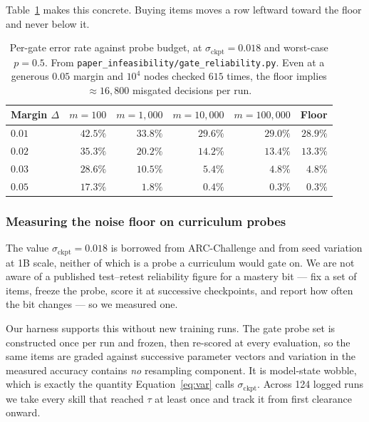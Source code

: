 \documentclass[11pt]{article}
\theoremstyle{plain}
\theoremstyle{definition}
\theoremstyle{remark}
\begin{document}
Table~\ref{tab:reliability} makes this concrete. Buying items moves a row
leftward toward the floor and never below it.

\begin{table}[ht]
\centering
\small
\begin{tabular}{@{}lrrrrr@{}}
\toprule
Margin $\Delta$ & $m{=}100$ & $m{=}1{,}000$ & $m{=}10{,}000$ & $m{=}100{,}000$ & Floor \\
\midrule
$0.01$ & $42.5\%$ & $33.8\%$ & $29.6\%$ & $29.0\%$ & $28.9\%$ \\
$0.02$ & $35.3\%$ & $20.2\%$ & $14.2\%$ & $13.4\%$ & $13.3\%$ \\
$0.03$ & $28.6\%$ & $10.5\%$ & $5.4\%$ & $4.8\%$ & $4.8\%$ \\
$0.05$ & $17.3\%$ & $1.8\%$ & $0.4\%$ & $0.3\%$ & $0.3\%$ \\
\bottomrule
\end{tabular}
\caption{Per-gate error rate against probe budget, at $\sigma_{\text{ckpt}} =
0.018$ and worst-case $p=0.5$. From
\texttt{paper\_infeasibility/gate\_reliability.py}. Even at a generous $0.05$
margin and $10^4$ nodes checked $615$ times, the floor implies ${\approx}16{,}800$
misgated decisions per run.}
\label{tab:reliability}
\end{table}

\subsubsection{Measuring the noise floor on curriculum probes}
\label{sec:measured}

The value $\sigma_{\text{ckpt}} = 0.018$ is borrowed from ARC-Challenge and from
seed variation at 1B scale, neither of which is a probe a curriculum would gate
on. We are not aware of a published test--retest reliability figure for a mastery
bit --- fix a set of items, freeze the probe, score it at successive checkpoints,
and report how often the bit changes --- so we measured one.

Our harness supports this without new training runs. The gate probe set is
constructed once per run and frozen, then re-scored at every evaluation, so the
same items are graded against successive parameter vectors and variation in the
measured accuracy contains \emph{no} resampling component. It is model-state
wobble, which is exactly the quantity Equation~\ref{eq:var} calls
$\sigma_{\text{ckpt}}$. Across 124 logged runs we take every skill that reached
$\tau$ at least once and track it from first clearance onward.
\end{document}
